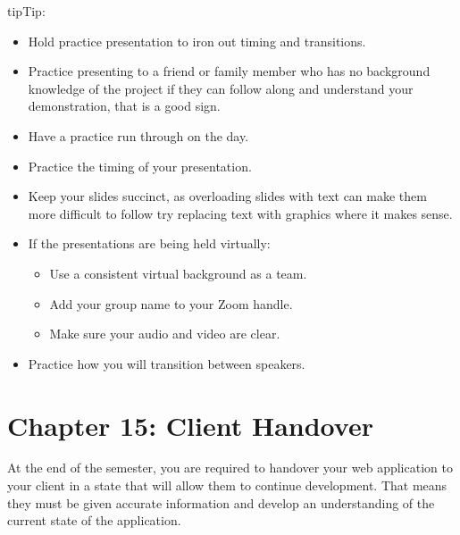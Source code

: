 \documentclass[letterpaper,10pt,english]{jupyterBook}
\begin{document}
\begin{sphinxadmonition}{tip}{Tip:}\begin{itemize}
\item {} 
\sphinxAtStartPar
Hold practice presentation to iron out timing and transitions.

\item {} 
\sphinxAtStartPar
Practice presenting to a friend or family member who has no
background knowledge of the project \sphinxhyphen{} if they can follow along and
understand your demonstration, that is a good sign.

\item {} 
\sphinxAtStartPar
Have a practice run through on the day.

\item {} 
\sphinxAtStartPar
Practice the timing of your presentation.

\item {} 
\sphinxAtStartPar
Keep your slides succinct, as overloading slides with text can make
them more difficult to follow \sphinxhyphen{} try replacing text with graphics
where it makes sense.

\item {} 
\sphinxAtStartPar
If the presentations are being held virtually:
\begin{itemize}
\item {} 
\sphinxAtStartPar
Use a consistent virtual background as a team.

\item {} 
\sphinxAtStartPar
Add your group name to your Zoom handle.

\item {} 
\sphinxAtStartPar
Make sure your audio and video are clear.

\end{itemize}

\item {} 
\sphinxAtStartPar
Practice how you will transition between speakers.

\end{itemize}
\end{sphinxadmonition}


\chapter{Chapter 15: Client Handover}
\label{\detokenize{chapter_15/client_handover:chapter-15-client-handover}}\label{\detokenize{chapter_15/client_handover::doc}}
\sphinxAtStartPar
At the end of the semester, you are required to handover your web application to your client in a state that will
allow them to continue development. That means they must be given accurate information and develop an understanding of
the current state of the application.
\end{document}
